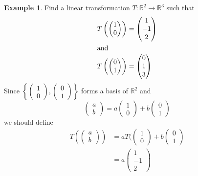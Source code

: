 \documentclass{report}
\theoremstyle{remark}
\theoremstyle{definition}
\theoremstyle{definition}
\newtheorem{example}[theorem]{Example}
\theoremstyle{theorem}
\begin{document}
\begin{example}
Find a linear transformation $T: \mathbb{R}^2 \rightarrow \mathbb{R}^3$ such that
\begin{align*}
    T\left(\begin{pmatrix}
    1\\0
    \end{pmatrix}\right) &= \begin{pmatrix}
    1\\-1\\2
    \end{pmatrix}\\
    \intertext{and}
    T\left(\begin{pmatrix}0\\1\end{pmatrix}\right) &= \begin{pmatrix}
    0\\1\\3
    \end{pmatrix}
\end{align*}
Since $\left\{\begin{pmatrix}
1\\0
\end{pmatrix}, \begin{pmatrix}
0\\1
\end{pmatrix}\right\}$ forms a basis of $\mathbb{R}^2$ and
\[\begin{pmatrix}
a\\b
\end{pmatrix} = a\begin{pmatrix}
1\\0
\end{pmatrix} + b\begin{pmatrix}
0\\1
\end{pmatrix}\]
we should define
\begin{align*}
    T\left(\begin{pmatrix}
a\\b
\end{pmatrix}\right) &= aT(\begin{pmatrix}
1\\0
\end{pmatrix} + b\begin{pmatrix}
0\\1
\end{pmatrix}\\
&= a\begin{pmatrix}
1\\-1\\2

\end{pmatrix}
\end{align*}
\end{example}
\end{document}
